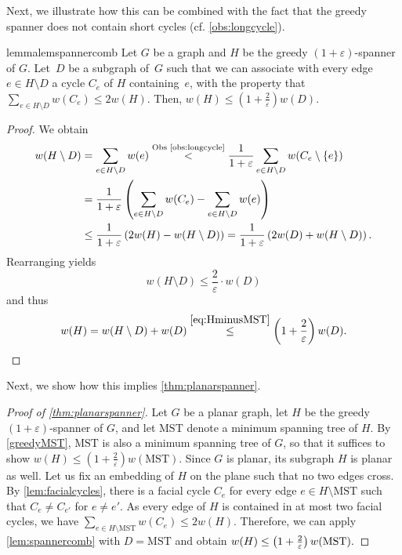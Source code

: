 \documentclass[a4paper,cleveref, autoref, thm-restate, thm-restate, UKenglish]{lipics-v2021}
\newcommand{\mst}{\mathrm{MST}}
\renewcommand{\epsilon}{\varepsilon}
\begin{document}
Next, we illustrate how this can be combined with the fact that the greedy spanner does not contain short cycles (cf. \cref{obs:longcycle}).

\begin{restatable}{lemma}{lemspannercomb}\label{lem:spannercomb}
Let $G$ be a graph and $H$ be the greedy $(1+\epsilon)$-spanner of $G$. Let~$D$ be a subgraph of~$G$ such that we can associate with
every edge $e \in H \setminus D$ a cycle $C_e$ of $H$ containing~$e$, 
with the property that 
$\sum_{e \in H \setminus D} w(C_e) \leq 2w(H)$. Then,
$
w(H) \leq \left(1+\frac{2}{\epsilon}\right)w(D).
$
\end{restatable}

\begin{proof}
We obtain
\begin{align*}
w(H \setminus D) &= \sum\limits_{e \in H \setminus D} w(e)
\overset{\text{Obs \ref{obs:longcycle}}}{<} \frac{1}{1+\epsilon}\sum\limits_{e \in H \setminus D} w(C_e \setminus \{e\})\\
&=\frac{1}{1+\epsilon} \left( \sum\limits_{e \in H \setminus D} w(C_e) - \sum\limits_{e \in H \setminus D} w(e)\right)\\
&\leq \frac{1}{1+\epsilon} \left( 2 w(H) - w(H \setminus D ) \right)
= \frac{1}{1+\epsilon} \left( 2 w(D) + w(H \setminus D ) \right).
\end{align*}
Rearranging yields
\begin{equation}\label{eq:HminusMST}
w(H \setminus D ) \leq \frac{2}{\epsilon} \cdot w(D)
\end{equation}
and thus
\begin{equation*}
w(H) =w(H \setminus D) + w(D) 
\overset{\eqref{eq:HminusMST}}{\leq} \left( 1+\frac{2}{\epsilon} \right) w(D).\qedhere
\end{equation*}
\end{proof}

Next, we show how this implies \cref{thm:planarspanner}.
\begin{proof}[Proof of \cref{thm:planarspanner}]
Let $G$ be a planar graph, let $H$ be the greedy $(1+\epsilon)$-spanner of $G$, and let $\mst$ denote a minimum spanning tree of $H$. By \cref{greedyMST}, $\mst$ is also a minimum spanning tree of $G$, so that it suffices to show ${w(H)\leq \left( 1+\frac{2}{\epsilon}\right) w(\mst)}$.
Since $G$ is planar, its subgraph $H$ is planar as well. Let us fix an embedding of $H$ on the plane such that no two edges cross. By \cref{lem:facialcycles}, there is a facial cycle $C_e$ for every edge $e \in H \setminus \mst$ such that $C_e \neq C_{e'}$ for $e \neq e'$. As every edge of $H$ is contained in at most two facial cycles, we have $\sum_{e \in H \setminus \mst} w(C_e) \leq 2 w(H)$. Therefore, we can apply \cref{lem:spannercomb} with $D=\mst$ and obtain
$
w(H) \leq \left( 1+\frac{2}{\epsilon} \right) w(\mst). \qedhere
$
\end{proof}
\end{document}
